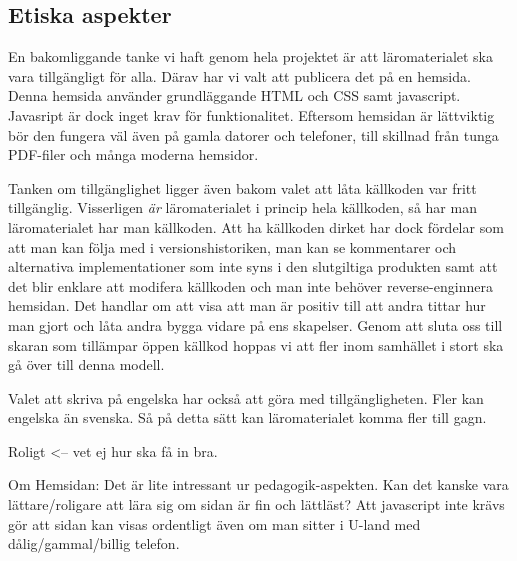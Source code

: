 \begin{binge}
\section{Etiska aspekter}

En bakomliggande tanke vi haft genom hela projektet är att läromaterialet ska vara tillgängligt för alla. Därav har vi valt att publicera det på en hemsida. Denna hemsida använder grundläggande HTML och CSS samt javascript. Javasript är dock inget krav för funktionalitet. Eftersom hemsidan är lättviktig bör den fungera väl även på gamla datorer och telefoner, till skillnad från tunga PDF-filer och många moderna hemsidor.

Tanken om tillgänglighet ligger även bakom valet att låta källkoden var fritt tillgänglig. Visserligen \textit{är} läromaterialet i princip hela källkoden, så har man läromaterialet har man källkoden. Att ha källkoden dirket har dock fördelar som att man kan följa med i versionshistoriken, man kan se kommentarer och alternativa implementationer som inte syns i den slutgiltiga produkten samt att det blir enklare att modifera källkoden och man inte behöver reverse-enginnera hemsidan. Det handlar om att visa att man är positiv till att andra tittar hur man gjort och låta andra bygga vidare på ens skapelser. Genom att sluta oss till skaran som tillämpar öppen källkod hoppas vi att fler inom samhället i stort ska gå över till denna modell.

Valet att skriva på engelska har också att göra med tillgängligheten. Fler kan engelska än svenska. Så på detta sätt kan läromaterialet komma fler till gagn.

Roligt <-- vet ej hur ska få in bra.



Om Hemsidan: 
  Det är lite intressant ur pedagogik-aspekten. Kan det
  kanske vara lättare/roligare att lära sig om sidan är fin och
  lättläst? Att javascript inte krävs gör att sidan kan visas ordentligt
  även om man sitter i U-land med dålig/gammal/billig telefon.


\end{binge}
